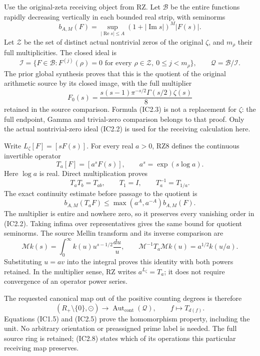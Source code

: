 \documentclass[
]{article}
\begin{document}
Use the original-zeta receiving object from RZ. Let \(\mathcal B\) be
the entire functions rapidly decreasing vertically in each bounded real
strip, with seminorms \[
b_{A,M}(F)=\sup_{|\operatorname{Re}s|\le A}
(1+|\operatorname{Im}s|)^M|F(s)|.
\tag{IC2.1}
\] Let \(\mathscr Z\) be the set of distinct actual nontrivial zeros of
the original \(\zeta\), and \(m_\rho\) their full multiplicities. The
closed ideal is \[
\mathcal I=\{F\in\mathcal B:F^{(j)}(\rho)=0
\text{ for every }\rho\in\mathscr Z,\ 0\le j<m_\rho\},
\qquad\mathcal Q=\mathcal B/\mathcal I.
\tag{IC2.2}
\] The prior global synthesis proves that this is the quotient of the
original arithmetic source by its closed image, with the full multiplier
\[
F_0(s)=\frac{s(s-1)\pi^{-s/2}\Gamma(s/2)\zeta(s)}8
\tag{IC2.3}
\] retained in the source comparison. Formula (IC2.3) is not a
replacement for \(\zeta\): the full endpoint, Gamma and trivial-zero
comparison belongs to that proof. Only the actual nontrivial-zero ideal
(IC2.2) is used for the receiving calculation here.

Write \(L_\zeta[F]=[sF(s)]\). For every real \(a>0\), RZ8 defines the
continuous invertible operator \[
T_a[F]=[a^sF(s)],\qquad a^s=\exp(s\log a).
\tag{IC2.4}
\] Here \(\log a\) is real. Direct multiplication proves \[
T_aT_b=T_{ab},\qquad T_1=I,\qquad T_a^{-1}=T_{1/a}.
\tag{IC2.5}
\] The exact continuity estimate before passage to the quotient is \[
b_{A,M}(T_aF)\le\max(a^A,a^{-A})b_{A,M}(F).
\tag{IC2.6}
\] The multiplier is entire and nowhere zero, so it preserves every
vanishing order in (IC2.2). Taking infima over representatives gives the
same bound for quotient seminorms. The source Mellin transform and its
inverse comparison are \[
\mathcal Mk(s)=\int_0^\infty k(u)u^{s-1/2}\frac{du}{u},
\qquad
\mathcal M^{-1}T_a\mathcal Mk(u)=a^{1/2}k(u/a).
\tag{IC2.7}
\] Substituting \(u=av\) into the integral proves this identity with
both powers retained. In the multiplier sense, RZ writes
\(a^{L_\zeta}=T_a\); it does not require convergence of an operator
power series.

The requested canonical map out of the positive counting degrees is
therefore \[
(R_+\setminus\{0\},\odot)\longrightarrow
\operatorname{Aut}_{\mathrm{cont}}(\mathcal Q),\qquad
f\longmapsto T_{d(f)}.
\tag{IC2.8}
\] Equations (IC1.5) and (IC2.5) prove the homomorphism property,
including the unit. No arbitrary orientation or preassigned prime label
is needed. The full source ring is retained; (IC2.8) states which of its
operations this particular receiving map preserves.
\end{document}
